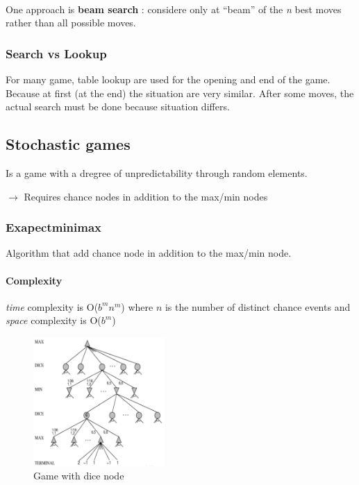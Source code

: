 \paragraph{ } One approach is \textbf{beam search} : considere only at ``beam'' of the 
\textit{n} best moves rather than all possible moves.


\subsubsection{Search vs Lookup}

For many  game, table lookup  are used for the  opening and end  of the 
game. Because  at first (at  the end)  the situation are  very similar. 
After  some moves,  the actual  search must  be done  because situation 
differs.                                                                



\subsection{Stochastic games}
Is a game with a dregree of unpredictability through random elements.

$\rightarrow$ Requires chance nodes in addition to the max/min nodes

\subsubsection{Exapectminimax} Algorithm that add chance node in addition to the max/min node.

\paragraph{Complexity} \textit{time} complexity is O($b^m n^m$) where $n$
is the number of distinct chance events and \textit{space} complexity is O($b^m$)

\begin{figure}[h]
    \centering
    \includegraphics[width=5cm]{stochastic.png}
    \caption{Game with dice node}
\end{figure}


